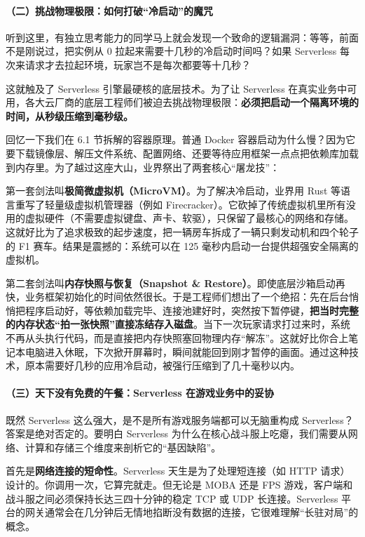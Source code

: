 \paragraph{（二）挑战物理极限：如何打破“冷启动”的魔咒}

听到这里，有独立思考能力的同学马上就会发现一个致命的逻辑漏洞：等等，前面不是刚说过，把实例从 0 拉起来需要十几秒的冷启动时间吗？如果 Serverless 每次来请求才去拉起环境，玩家岂不是每次都要等十几秒？

这就触及了 Serverless 引擎最硬核的底层技术。为了让 Serverless 在真实业务中可用，各大云厂商的底层工程师们被迫去挑战物理极限：\textbf{必须把启动一个隔离环境的时间，从秒级压缩到毫秒级。}

回忆一下我们在 6.1 节拆解的容器原理。普通 Docker 容器启动为什么慢？因为它要下载镜像层、解压文件系统、配置网络、还要等待应用框架一点点把依赖库加载到内存里。为了越过这座大山，业界祭出了两套核心“屠龙技”：

第一套剑法叫\textbf{极简微虚拟机（MicroVM）}。为了解决冷启动，业界用 Rust 等语言重写了轻量级虚拟机管理器（例如 Firecracker）。它砍掉了传统虚拟机里所有没用的虚拟硬件（不需要虚拟键盘、声卡、软驱），只保留了最核心的网络和存储。这就好比为了追求极致的起步速度，把一辆房车拆成了一辆只剩发动机和四个轮子的 F1 赛车。结果是震撼的：系统可以在 125 毫秒内启动一台提供超强安全隔离的虚拟机。

第二套剑法叫\textbf{内存快照与恢复（Snapshot \& Restore）}。即使底层沙箱启动再快，业务框架初始化的时间依然很长。于是工程师们想出了一个绝招：先在后台悄悄把程序启动好，等依赖加载完毕、连接池建好时，突然按下暂停键，\textbf{把当时完整的内存状态“拍一张快照”直接冻结存入磁盘}。当下一次玩家请求打过来时，系统不再从头执行代码，而是直接把内存快照塞回物理内存“解冻”。这就好比你合上笔记本电脑进入休眠，下次掀开屏幕时，瞬间就能回到刚才暂停的画面。通过这种技术，原本需要好几秒的应用冷启动，被强行压缩到了几十毫秒以内。

\paragraph{（三）天下没有免费的午餐：Serverless 在游戏业务中的妥协}

既然 Serverless 这么强大，是不是所有游戏服务端都可以无脑重构成 Serverless？答案是绝对否定的。要明白 Serverless 为什么在核心战斗服上吃瘪，我们需要从网络、计算和存储三个维度来剖析它的“基因缺陷”。



首先是\textbf{网络连接的短命性}。Serverless 天生是为了处理短连接（如 HTTP 请求）设计的。你调用一次，它算完就走。但无论是 MOBA 还是 FPS 游戏，客户端和战斗服之间必须保持长达三四十分钟的稳定 TCP 或 UDP 长连接。Serverless 平台的网关通常会在几分钟后无情地掐断没有数据的连接，它很难理解“长驻对局”的概念。

